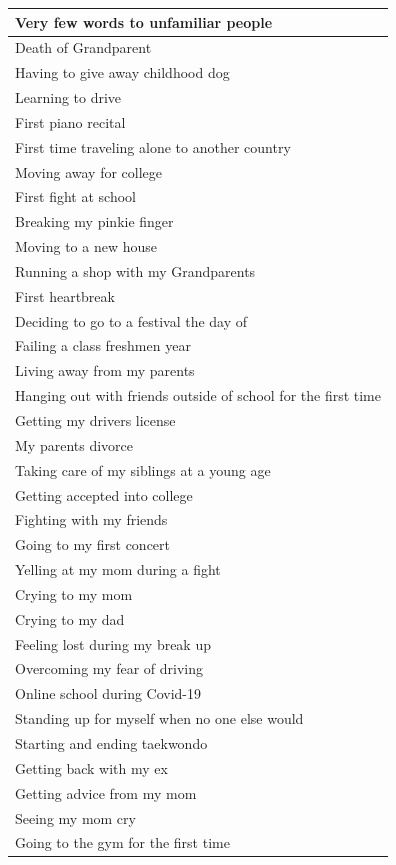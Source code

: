 \documentclass[
  .7em,
  letterpaper,
  DIV=11,
  numbers=noendperiod]{scrartcl}
\begin{document}
\begin{table}
\begin{tabular}{l}
\hline
Very few words to unfamiliar people\\
\hline
Death of Grandparent\\
\hline
Having to give away childhood dog\\
\hline
Learning to drive\\
\hline
First piano recital\\
\hline
First time traveling alone to another country\\
\hline
Moving away for college\\
\hline
First fight at school\\
\hline
Breaking my pinkie finger\\
\hline
Moving to a new house\\
\hline
Running a shop with my Grandparents\\
\hline
First heartbreak\\
\hline
Deciding to go to a festival the day of\\
\hline
Failing a class freshmen year\\
\hline
Living away from my parents\\
\hline
Hanging out with friends outside of school for the first time\\
\hline
Getting my drivers license\\
\hline
My parents divorce\\
\hline
Taking care of my siblings at a young age\\
\hline
Getting accepted into college\\
\hline
Fighting with my friends\\
\hline
Going to my first concert\\
\hline
Yelling at my mom during a fight\\
\hline
Crying to my mom\\
\hline
Crying to my dad\\
\hline
Feeling lost during my break up\\
\hline
Overcoming my fear of driving\\
\hline
Online school during Covid-19\\
\hline
Standing up for myself when no one else would\\
\hline
Starting and ending taekwondo\\
\hline
Getting back with my ex\\
\hline
Getting advice from my mom\\
\hline
Seeing my mom cry\\
\hline
Going to the gym for the first time\\

\end{tabular}
\end{table}
\end{document}
